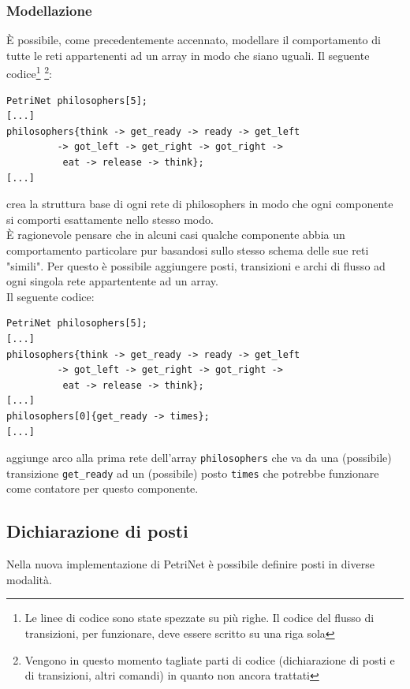 \documentclass[italian,12pt]{book}
\begin{document}
\subsubsection{Modellazione}
È possibile, come precedentemente accennato, modellare il comportamento di tutte le reti appartenenti ad un 
array in modo che siano uguali. Il seguente codice\footnote{Le linee di codice sono state spezzate su più 
righe. Il codice del flusso di transizioni, per funzionare, deve essere scritto su una riga sola} \footnote{
Vengono in questo momento tagliate parti di codice (dichiarazione di posti e di transizioni, altri comandi) in
quanto non ancora trattati}:
\begin{verbatim}PetriNet philosophers[5];
[...]
philosophers{think -> get_ready -> ready -> get_left 
	     -> got_left -> get_right -> got_right -> 
	      eat -> release -> think};
[...]
\end{verbatim}
crea la struttura base di ogni rete di philosophers in modo che ogni componente si comporti esattamente nello
stesso modo.\\
È ragionevole pensare che in alcuni casi qualche componente abbia un comportamento particolare  pur basandosi 
sullo stesso schema delle sue reti "simili". Per questo è possibile aggiungere posti, transizioni e archi di 
flusso ad ogni singola rete appartentente ad un array.\\
Il seguente codice:
\begin{verbatim}PetriNet philosophers[5];
[...]
philosophers{think -> get_ready -> ready -> get_left 
	     -> got_left -> get_right -> got_right -> 
	      eat -> release -> think};
[...]
philosophers[0]{get_ready -> times};
[...]
\end{verbatim}
aggiunge arco alla prima rete dell'array {\tt philosophers} che va da una (possibile) transizione {\tt get\_ready}
ad un (possibile) posto {\tt times} che potrebbe funzionare come contatore per questo componente.

\subsection{Dichiarazione di posti}\label{ssect:nuovi_posti}
Nella nuova implementazione di PetriNet è possibile definire posti in diverse modalità.\\
\end{document}
